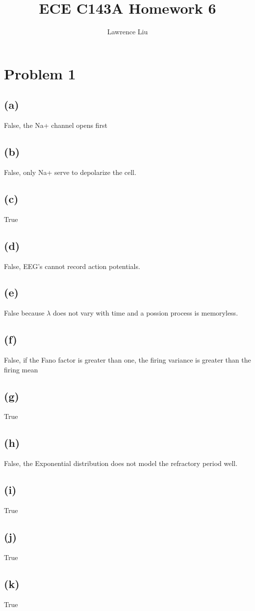 \documentclass[12pt]{article}
\title{ECE C143A Homework 6}
\author{Lawrence Liu}
\begin{document}
\maketitle
\section*{Problem 1}
\subsection*{(a)}
False, the Na+ channel opens first
\subsection*{(b)}
False, only Na+ serve to depolarize the cell.
\subsection*{(c)}
True
\subsection*{(d)}
False, EEG's cannot record action potentials.
\subsection*{(e)}
False because $\lambda$ does not vary with time and a possion process is memoryless.
\subsection*{(f)}
False, if the Fano factor is greater than one, the firing variance is greater than the firing mean
\subsection*{(g)}
True
\subsection*{(h)}
False, the Exponential distribution does not model the refractory period well.
\subsection*{(i)}
True
\subsection*{(j)}
True
\subsection*{(k)}
True
\end{document}
